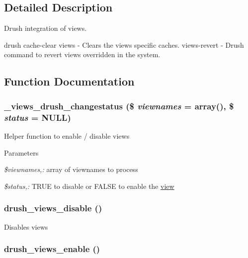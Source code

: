 \subsection{Detailed Description}
Drush integration of views.

drush cache-\/clear views -\/ Clears the views specific caches. views-\/revert -\/ Drush command to revert views overridden in the system. 

\subsection{Function Documentation}
\hypertarget{views_8drush_8inc_a62b117ad4cd01eafc92575eb5e37c59c}{
\subsubsection[{\_\-views\_\-drush\_\-changestatus}]{\setlength{\rightskip}{0pt plus 5cm}\_\-views\_\-drush\_\-changestatus (\$ {\em viewnames} = {\ttfamily array()}, \/  \$ {\em status} = {\ttfamily NULL})}}
\label{views_8drush_8inc_a62b117ad4cd01eafc92575eb5e37c59c}
Helper function to enable / disable views 
\begin{DoxyParams}{Parameters}
\item[{\em \$viewnames,:}]array of viewnames to process \item[{\em \$status,:}]TRUE to disable or FALSE to enable the \hyperlink{classview}{view} \end{DoxyParams}
\hypertarget{views_8drush_8inc_a57c880b394aed2fcbc92df64aff008a5}{
\subsubsection[{drush\_\-views\_\-disable}]{\setlength{\rightskip}{0pt plus 5cm}drush\_\-views\_\-disable ()}}
\label{views_8drush_8inc_a57c880b394aed2fcbc92df64aff008a5}
Disables views \hypertarget{views_8drush_8inc_afb0fd06776785d9525080d414e981ccb}{
\subsubsection[{drush\_\-views\_\-enable}]{\setlength{\rightskip}{0pt plus 5cm}drush\_\-views\_\-enable ()}}
